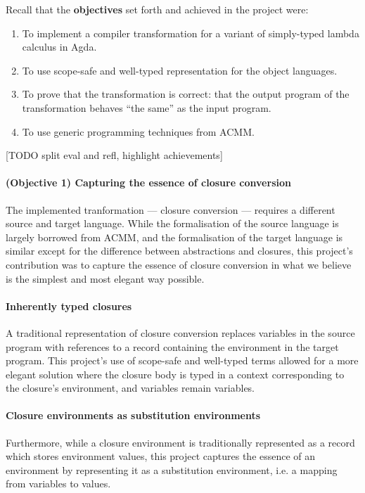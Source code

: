 \documentclass[bsc,frontabs,oneside,singlespacing,parskip,deptreport]{infthesis}
\theoremstyle{definition}
\theoremstyle{lemma}
\begin{document}
Recall that the \textbf{objectives} set forth and achieved in the
project were:

\begin{enumerate}
\item To implement a compiler transformation for a variant of
  simply-typed lambda calculus in Agda.
\item To use scope-safe and well-typed representation for the object
  languages.
\item To prove that the transformation is correct: that the output
  program of the transformation behaves ``the same'' as the input
  program.
\item To use generic programming techniques from ACMM.
\end{enumerate}

[TODO split eval and refl, highlight achievements]

\paragraph{(Objective 1) Capturing the essence of closure conversion}
The implemented tranformation --- closure conversion --- requires a
different source and target language. While the formalisation of the
source language is largely borrowed from ACMM, and the formalisation
of the target language is similar except for the difference between
abstractions and closures, this project's contribution was to capture
the essence of closure conversion in what we believe is the simplest
and most elegant way possible.

\paragraph{Inherently typed closures}
A traditional representation of closure conversion replaces variables
in the source program with references to a record containing the
environment in the target program. This project's use of scope-safe
and well-typed terms allowed for a more elegant solution where the
closure body is typed in a context corresponding to the closure's
environment, and variables remain variables.

\paragraph{Closure environments as substitution environments}
Furthermore, while a closure environment is traditionally represented
as a record which stores environment values, this project captures the
essence of an environment by representing it as a substitution
environment, i.e. a mapping from variables to values.
\end{document}
